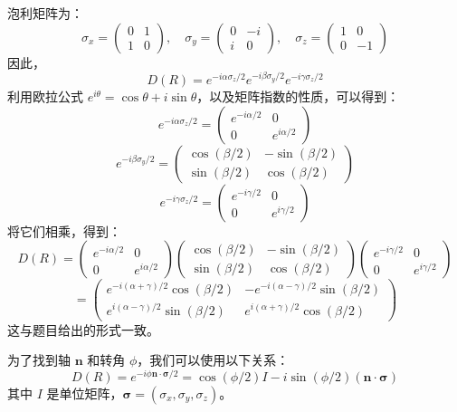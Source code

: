 \documentclass{article}
\begin{document}
泡利矩阵为：
\[
\sigma_x = \begin{pmatrix} 0 & 1 \\ 1 & 0 \end{pmatrix}, \quad
\sigma_y = \begin{pmatrix} 0 & -i \\ i & 0 \end{pmatrix}, \quad
\sigma_z = \begin{pmatrix} 1 & 0 \\ 0 & -1 \end{pmatrix}
\]
因此，
\[
D(R) = e^{-i\alpha \sigma_z/2} e^{-i\beta \sigma_y/2} e^{-i\gamma \sigma_z/2}
\]
利用欧拉公式 \(e^{i\theta} = \cos\theta + i\sin\theta\)，以及矩阵指数的性质，可以得到：
\[
e^{-i\alpha \sigma_z/2} = \begin{pmatrix} e^{-i\alpha/2} & 0 \\ 0 & e^{i\alpha/2} \end{pmatrix}
\]
\[
e^{-i\beta \sigma_y/2} = \begin{pmatrix} \cos(\beta/2) & -\sin(\beta/2) \\ \sin(\beta/2) & \cos(\beta/2) \end{pmatrix}
\]
\[
e^{-i\gamma \sigma_z/2} = \begin{pmatrix} e^{-i\gamma/2} & 0 \\ 0 & e^{i\gamma/2} \end{pmatrix}
\]
将它们相乘，得到：
\[
D(R) = \begin{pmatrix} e^{-i\alpha/2} & 0 \\ 0 & e^{i\alpha/2} \end{pmatrix} \begin{pmatrix} \cos(\beta/2) & -\sin(\beta/2) \\ \sin(\beta/2) & \cos(\beta/2) \end{pmatrix} \begin{pmatrix} e^{-i\gamma/2} & 0 \\ 0 & e^{i\gamma/2} \end{pmatrix}
\]
\[
= \begin{pmatrix} e^{-i(\alpha+\gamma)/2} \cos(\beta/2) & -e^{-i(\alpha-\gamma)/2} \sin(\beta/2) \\ e^{i(\alpha-\gamma)/2} \sin(\beta/2) & e^{i(\alpha+\gamma)/2} \cos(\beta/2) \end{pmatrix}
\]
这与题目给出的形式一致。

为了找到轴 \(\mathbf{n}\) 和转角 \(\phi\)，我们可以使用以下关系：
\[
D(R) = e^{-i\phi \mathbf{n}\cdot\boldsymbol{\sigma}/2} = \cos(\phi/2)I - i\sin(\phi/2)(\mathbf{n}\cdot\boldsymbol{\sigma})
\]
其中 \(I\) 是单位矩阵，\(\boldsymbol{\sigma} = (\sigma_x, \sigma_y, \sigma_z)\)。
\end{document}

